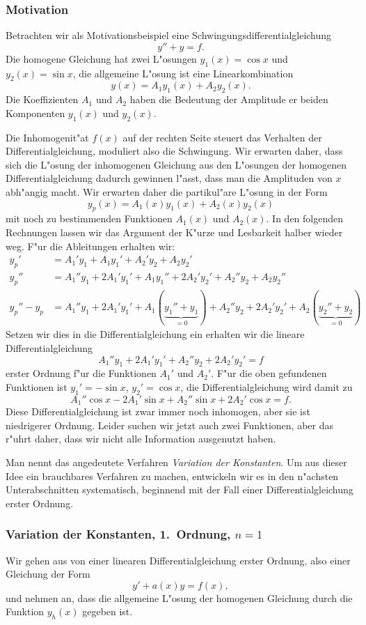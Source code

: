 \subsubsection{Motivation}
Betrachten wir als Motivationsbeispiel eine Schwingungsdifferentialgleichung
\[
y''+y=f.
\]
Die homogene Gleichung hat zwei L"osungen $y_1(x)=\cos x$ und $y_2(x)=\sin x$,
die allgemeine L"osung ist eine Linearkombination 
\[
y(x)=A_1y_1(x)+A_2y_2(x).
\]
Die Koeffizienten $A_1$ und $A_2$ haben die Bedeutung der Amplitude er
beiden Komponenten $y_1(x)$ und $y_2(x)$.

Die Inhomogenit"at $f(x)$ auf der rechten Seite steuert das Verhalten
der Differentialgleichung, moduliert also die Schwingung.
Wir erwarten daher, dass sich die L"osung der inhomogenen Gleichung
aus den L"osungen der homogenen Differentialgleichung dadurch gewinnen
l"asst, dass man die Amplituden von $x$ abh"angig macht.
Wir erwarten daher die partikul"are L"osung in der Form
\[
y_p(x)=A_1(x)y_1(x)+A_2(x)y_2(x)
\]
mit noch zu bestimmenden Funktionen $A_1(x)$ und $A_2(x)$.
In den folgenden Rechnungen lassen wir das Argument der K"urze und Lesbarkeit
halber wieder weg.
F"ur die Ableitungen erhalten wir:
\begin{align*}
y_p'
&=
A_1'y_1+A_1y_1'+A_2'y_2+A_2y_2'
\\
y_p''
&=
A_1''y_1+2A_1'y_1'+A_1y_1''+2A_2'y_2'+A_2''y_2+A_2y_2''
\\
y_p''-y_p
&=
A_1''y_1+2A_1'y_1'+A_1(\underbrace{y_1''+y_1}_{=0})
+
A_2''y_2+2A_2'y_2'+A_2(\underbrace{y_2''+y_2}_{=0})
\end{align*}
Setzen wir dies in die Differentialgleichung ein erhalten wir die
lineare Differentialgleichung 
\[
A_1''y_1+2A_1'y_1' +A_2''y_2+2A_2'y_2'=f
\]
erster Ordnung f"ur die Funktionen $A_1'$ und $A_2'$.
F"ur die oben gefundenen Funktionen ist $y_1'=-\sin x$, $y_2'=\cos x$,
die Differentialgleichung wird damit zu
\[
A_1''\cos x -2A_1'\sin x +A_2''\sin x+2A_2'\cos x=f.
\]
Diese Differentialgleichung ist zwar immer noch inhomogen, aber sie
ist niedrigerer Ordnung.
Leider suchen wir jetzt auch zwei Funktionen, aber das r"uhrt daher, dass
wir nicht alle Information ausgenutzt haben.

Man nennt das angedeutete Verfahren {\em Variation der Konstanten}.
Um aus dieser Idee ein brauchbares Verfahren zu machen, entwickeln wir es
in den n"achsten Unterabschnitten systematisch, beginnend mit der Fall
einer Differentialgleichung erster Ordnung.

\subsubsection{Variation der Konstanten, 1.~Ordnung, $n=1$}
Wir gehen aus von einer linearen Differentialgleichung erster Ordnung,
also einer Gleichung der Form
\[
y' + a(x)y=f(x),
\]
und nehmen an, dass die allgemeine L"osung der homogenen Gleichung
durch die Funktion $y_h(x)$ gegeben ist.

